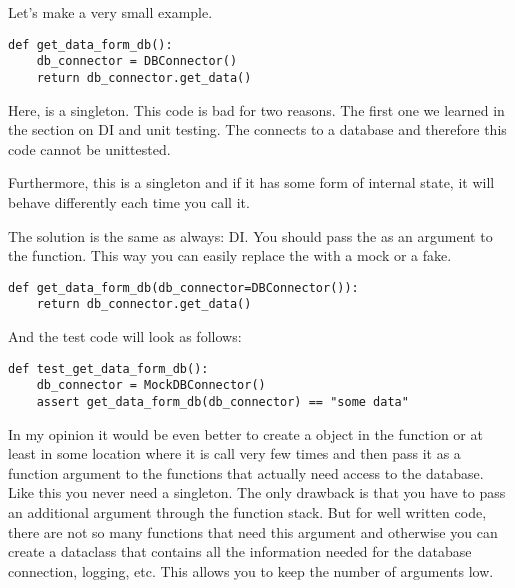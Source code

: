 Let's make a very small example.

\begin{programcode}{}
\begin{verbatim}
def get_data_form_db():
    db_connector = DBConnector()
    return db_connector.get_data()
\end{verbatim}
\end{programcode}

Here,  is a singleton. This code is bad for two reasons. The first one we learned in the section on DI and unit testing. The  connects to a database and therefore this code cannot be unittested.

Furthermore, this is a singleton and if it has some form of internal state, it will behave differently each time you call it.

The solution is the same as always: DI. You should pass the  as an argument to the function. This way you can easily replace the  with a mock or a fake.

\begin{programcode}{}
\begin{verbatim}
def get_data_form_db(db_connector=DBConnector()):
    return db_connector.get_data()
\end{verbatim}
\end{programcode}

And the test code will look as follows:

\begin{programcode}{}
\begin{verbatim}
def test_get_data_form_db():
    db_connector = MockDBConnector()
    assert get_data_form_db(db_connector) == "some data"
\end{verbatim}
\end{programcode}

In my opinion it would be even better to create a  object in the  function or at least in some location where it is call very few times and then pass it as a function argument to the functions that actually need access to the database. Like this you never need a singleton. The only drawback is that you have to pass an additional argument through the function stack. But for well written code, there are not so many functions that need this argument and otherwise you can create a dataclass that contains all the information needed for the database connection, logging, etc. This allows you to keep the number of arguments low.

